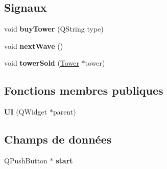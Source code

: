 \subsection*{Signaux}
\begin{DoxyCompactItemize}
\item 
\hypertarget{classUI_aff34760681ad834d325122691afc8454}{
void {\bfseries buyTower} (QString type)}
\label{classUI_aff34760681ad834d325122691afc8454}

\item 
\hypertarget{classUI_a63ad3c5f5b04203406c224ed01f50ddb}{
void {\bfseries nextWave} ()}
\label{classUI_a63ad3c5f5b04203406c224ed01f50ddb}

\item 
\hypertarget{classUI_a9c3ac46b4d04af5455a74f1034b44f26}{
void {\bfseries towerSold} (\hyperlink{classTower}{Tower} $\ast$tower)}
\label{classUI_a9c3ac46b4d04af5455a74f1034b44f26}

\end{DoxyCompactItemize}
\subsection*{Fonctions membres publiques}
\begin{DoxyCompactItemize}
\item 
\hypertarget{classUI_a983ff4bdfc1543f6ea015c21526d70b6}{
{\bfseries UI} (QWidget $\ast$parent)}
\label{classUI_a983ff4bdfc1543f6ea015c21526d70b6}

\end{DoxyCompactItemize}
\subsection*{Champs de données}
\begin{DoxyCompactItemize}
\item 
\hypertarget{classUI_a02df204852b5bbb75015490337b1da5f}{
QPushButton $\ast$ {\bfseries start}}
\label{classUI_a02df204852b5bbb75015490337b1da5f}

\end{DoxyCompactItemize}
